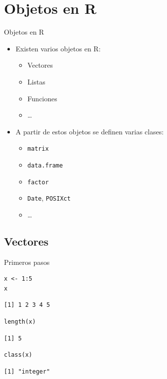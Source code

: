 \documentclass[xcolor={usenames,svgnames,dvipsnames}]{beamer}
\begin{document}
\section{Objetos en R}
\label{sec:orgheadline38}

\begin{frame}[fragile,label={sec:orgheadline19}]{Objetos en R}
 \begin{itemize}
\item Existen varios objetos en R:
\begin{itemize}
\item Vectores
\item Listas
\item Funciones
\item \ldots{}
\end{itemize}
\item A partir de estos objetos se definen varias clases:
\begin{itemize}
\item \texttt{matrix}
\item \texttt{data.frame}
\item \texttt{factor}
\item \texttt{Date}, \texttt{POSIXct}
\item \ldots{}
\end{itemize}
\end{itemize}
\end{frame}

\subsection{Vectores}
\label{sec:orgheadline24}

\begin{frame}[fragile,label={sec:orgheadline20}]{Primeros pasos}
 \lstset{language=R,label= ,caption= ,captionpos=b,numbers=none}
\begin{lstlisting}
x <- 1:5
x
\end{lstlisting}

\begin{verbatim}
[1] 1 2 3 4 5
\end{verbatim}

\lstset{language=R,label= ,caption= ,captionpos=b,numbers=none}
\begin{lstlisting}
length(x)
\end{lstlisting}

\begin{verbatim}
[1] 5
\end{verbatim}

\lstset{language=R,label= ,caption= ,captionpos=b,numbers=none}
\begin{lstlisting}
class(x)
\end{lstlisting}

\begin{verbatim}
[1] "integer"
\end{verbatim}
\end{frame}
\end{document}
